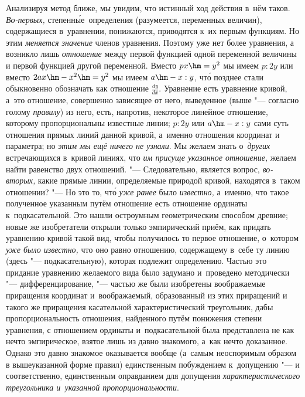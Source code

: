 Анализируя метод ближе, мы увидим, что истинный ход действия в~нём таков.
{\em Во-первых,} степенн\'{ы}е~определения (разумеется, переменных величин),
содержащиеся в~уравнении, понижаются, приводятся к~их первым функциям. Но этим
{\em меняется значение} членов уравнения. Поэтому уже нет более уравнения,
а возникло лишь {\em отношение} между первой функцией одной переменной величины
и первой функцией другой переменной. Вместо $px\hm=y^2$ мы имеем $p:2y$ или
вместо $2ax\hm-x^2\hm=y^2$ мы имеем $a\hm-x:y$, чт\'{о} позднее стали
обыкновенно обозначать как отношение $\frac{dy}{dx}$. Уравнение есть уравнение
кривой, а~это отношение, совершенно зависящее от него, выведенное (выше "---
согласно голому {\em правилу}) из него, есть, напротив, некоторое линейное
отношение, которому пропорциональны известные линии; $p:2y$ или $a\hm-x:y$ сами
суть отношения прямых линий данной кривой, а~именно отношения координат и
параметра; но {\em этим мы ещё ничего не узнали}. Мы желаем знать
о~{\em других} встречающихся в~кривой линиях, что {\em им присуще указанное
отношение,} желаем найти равенство двух отношений. "--- Следовательно, является
вопрос, {\em во-вторых,} какие прямые линии, определяемые природой кривой,
находятся в~таком отношении? "--- Но это то, чт\'{о} {\em уже ранее} было
{\em известно,} а~именно, что такое полученное указанным путём отношение есть
отношение ординаты к~подкасательной. Это нашли остроумным геометрическим
способом древние; новые же изобретатели открыли только эмпирический приём, как
придать уравнению кривой такой вид, чтобы получилось то первое отношение,
о~котором {\em уже было известно,} что оно равно отношению, содержащему в~себе
ту линию (здесь "--- подкасательную), которая подлежит определению. Частью это
придание уравнению желаемого вида было задумано и~проведено методически
"--- дифференцирование, "--- частью же были изобретены воображаемые
приращения координат и~воображаемый, образованный из этих приращений и
такого же приращения касательной характеристический треугольник, дабы
пропорциональность отношения, найденного путём понижения степени уравнения,
с отношением ординаты и~подкасательной была представлена не как нечто
эмпирическое, взятое лишь из давно знакомого, а~как нечто доказанное.
Однако это давно знакомое оказывается вообще (а~самым неоспоримым образом в
вышеуказанной форме правил) единственным побуждением к~допущению "--- и
соответственно, единственным оправданием для допущения
{\em характеристического треугольника и~указанной пропорциональности}.

